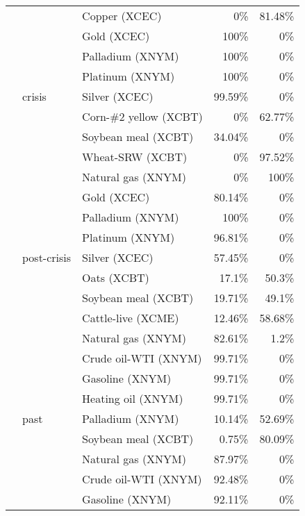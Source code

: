 \documentclass[]{elsarticle} %
\begin{document}
\begin{longtable}[t]{>{}lllrr}
\nopagebreak
 &  & Copper (XCEC) & 0\% & 81.48\%\\
\nopagebreak
 &  & Gold (XCEC) & 100\% & 0\%\\
\nopagebreak
 &  & Palladium (XNYM) & 100\% & 0\%\\
\nopagebreak
 &  & Platinum (XNYM) & 100\% & 0\%\\
\nopagebreak
 & \multirow[t]{-8}{*}{\raggedright\arraybackslash crisis} & Silver (XCEC) & 99.59\% & 0\%\\
\nopagebreak
 &  & Corn-\#2 yellow (XCBT) & 0\% & 62.77\%\\
\nopagebreak
 &  & Soybean meal (XCBT) & 34.04\% & 0\%\\
\nopagebreak
 &  & Wheat-SRW (XCBT) & 0\% & 97.52\%\\
\nopagebreak
 &  & Natural gas (XNYM) & 0\% & 100\%\\
\nopagebreak
 &  & Gold (XCEC) & 80.14\% & 0\%\\
\nopagebreak
 &  & Palladium (XNYM) & 100\% & 0\%\\
\nopagebreak
 &  & Platinum (XNYM) & 96.81\% & 0\%\\
\nopagebreak
\multirow[t]{-32}{*}{\raggedright\arraybackslash \textbf{CHP}} & \multirow[t]{-8}{*}{\raggedright\arraybackslash post-crisis} & Silver (XCEC) & 57.45\% & 0\%\\
\cmidrule{1-5}\pagebreak[0]
 &  & Oats (XCBT) & 17.1\% & 50.3\%\\
\nopagebreak
 &  & Soybean meal (XCBT) & 19.71\% & 49.1\%\\
\nopagebreak
 &  & Cattle-live (XCME) & 12.46\% & 58.68\%\\
\nopagebreak
 &  & Natural gas (XNYM) & 82.61\% & 1.2\%\\
\nopagebreak
 &  & Crude oil-WTI (XNYM) & 99.71\% & 0\%\\
\nopagebreak
 &  & Gasoline (XNYM) & 99.71\% & 0\%\\
\nopagebreak
 &  & Heating oil (XNYM) & 99.71\% & 0\%\\
\nopagebreak
 & \multirow[t]{-8}{*}{\raggedright\arraybackslash past} & Palladium (XNYM) & 10.14\% & 52.69\%\\
\nopagebreak
 &  & Soybean meal (XCBT) & 0.75\% & 80.09\%\\
\nopagebreak
 &  & Natural gas (XNYM) & 87.97\% & 0\%\\
\nopagebreak
 &  & Crude oil-WTI (XNYM) & 92.48\% & 0\%\\
\nopagebreak
 &  & Gasoline (XNYM) & 92.11\% & 0\%\\

\end{longtable}
\end{document}
